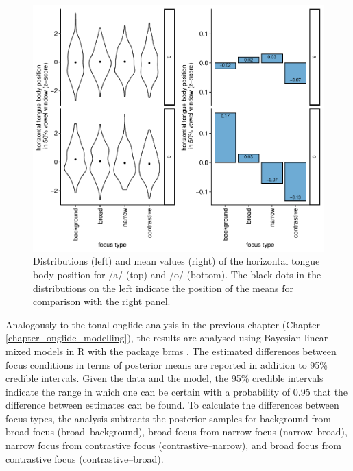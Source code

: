 \begin{figure}[htbp]
\begin{center}
\includegraphics[width=\textwidth]{figures/ch7/tbox.pdf}
\caption[Distributions and mean values of the horizontal tongue body position.]{Distributions (left) and mean values (right) of the horizontal tongue body position for /a/ (top) and /o/ (bottom). The black dots in the distributions on the left indicate the position of the means for comparison with the right panel.}
\label{fig:tbox}
\end{center}
\end{figure}

Analogously to the tonal onglide analysis in the previous chapter (Chapter \ref{chapter_onglide_modelling}), the results are analysed using Bayesian linear mixed models in R \citep{RCoreTeam2018} with the package brms \citep{Buerkner2018}. The estimated differences between focus conditions in terms of posterior means are reported in addition to 95\% credible intervals. Given the data and the model, the 95\% credible intervals indicate the range in which one can be certain with a probability of 0.95 that the difference between estimates can be found. To calculate the differences between focus types, the analysis subtracts the posterior samples for background from broad focus (broad–background), broad focus from narrow focus (narrow–broad), narrow focus from contrastive focus (contrastive–narrow), and broad focus from contrastive focus (contrastive–broad). 

